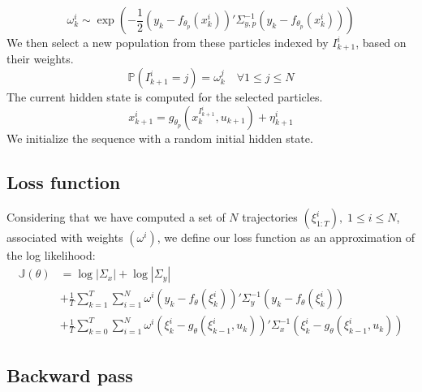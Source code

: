 \documentclass[10pt,a4paper]{report}
\begin{document}
$$\omega_k^i \sim \exp(-\frac{1}{2}(y_k - f_{\theta_p}(x_k^i))'\Sigma^{-1}_{y, p}(y_k - f_{\theta_p}(x_k^i)))$$
We then select a new population from these particles indexed by $I_{k+1}^i$, based on their weights.
$$\mathbb{P}(I_{k+1}^i=j) = \omega_k^j \quad \forall 1 \leq j \leq N$$
The current hidden state is computed for the selected particles.
$$x^i_{k+1} = g_{\theta_p}(x_k^{I_{k+1}^i}, u_{k+1}) + \eta^i_{k+1}$$
We initialize the sequence with a random initial hidden state.

\subsection{Loss function}
Considering that we have computed a set of $N$ trajectories $(\xi^i_{1:T}),\;1 \leq i \leq N$, associated with weights $(\omega^i)$, we define our loss function as an approximation of the log likelihood:
\begin{align*}
        \mathbb{J}(\theta) & = \log |\Sigma_x| + \log |\Sigma_y|                                                                                                        \\
                           & + \frac{1}{T}\sum_{k=1}^T \sum_{i=1}^N \omega^i (y_k - f_\theta(\xi_k^i))' \Sigma_y^{-1} (y_k - f_\theta(\xi_k^i))                         \\
                           & + \frac{1}{T}\sum_{k=0}^T \sum_{i=1}^N \omega^i (\xi_k^i - g_\theta(\xi_{k-1}^i, u_k))'\Sigma_x^{-1}(\xi_k^i - g_\theta(\xi_{k-1}^i, u_k))
\end{align*}

\subsection{Backward pass}
\end{document}
